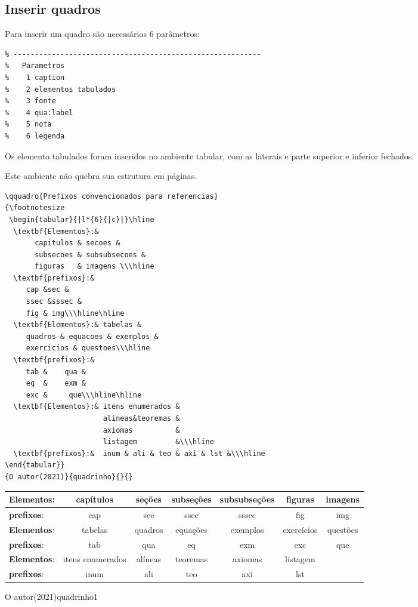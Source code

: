 \subsection[Quadros]{Inserir quadros}\label{ssec:quadros}

Para inserir um quadro são necessários 6 parâmetros:

\begin{lstlisting}
% ----------------------------------------------------------
%   Parametros
%    1 caption
%    2 elementos tabulados
%    3 fonte
%    4 qua:label
%    5 nota
%    6 legenda
\end{lstlisting}

Os elemento tabulados foram inseridos no ambiente tabular, com as laterais e parte superior e inferior fechados.

Este ambiente não quebra sua estrutura em páginas.

\begin{lstlisting}
\qquadro{Prefixos convencionados para referencias}
{\footnotesize
 \begin{tabular}{|l*{6}{|c}|}\hline
  \textbf{Elementos}:& 
       capitulos & secoes & 
       subsecoes & subsubsecoes &
       figuras   & imagens \\\hline
  \textbf{prefixos}:&
     cap &sec &
     ssec &sssec &
     fig & img\\\hline\hline
  \textbf{Elementos}:& tabelas &
     quadros & equacoes & exemplos &
     exercicios & questoes\\\hline	
  \textbf{prefixos}:&
     tab &    qua & 
     eq  &    exm & 
     exc &     que\\\hline\hline
  \textbf{Elementos}:& itens enumerados &
                       alineas&teoremas &
                       axiomas          & 
                       listagem         &\\\hline
  \textbf{prefixos}:&  inum & ali & teo & axi & lst &\\\hline
\end{tabular}}
{O autor(2021)}{quadrinho}{}{}
\end{lstlisting}

{\footnotesize
 \begin{tabular}{|l*{6}{|c}|}\hline
  \textbf{Elementos}:& capítulos& 	seções&	subseções&	subsubseções&	
  figuras&	imagens \\\hline
  \textbf{prefixos}:&cap&sec&ssec&sssec&fig & img\\\hline\hline
  \textbf{Elementos}:&tabelas&	quadros&	
  equações& exemplos& exercícios & questões\\\hline	
  \textbf{prefixos}:&tab&qua&eq& exm & exc&que\\\hline\hline
  \textbf{Elementos}:&itens enumerados& alíneas&teoremas&	axiomas & listagem &\\\hline
  \textbf{prefixos}:&inum &ali&teo& axi &lst&\\\hline
\end{tabular}}
{O autor(2021)}{quadrinho1}{}{}


